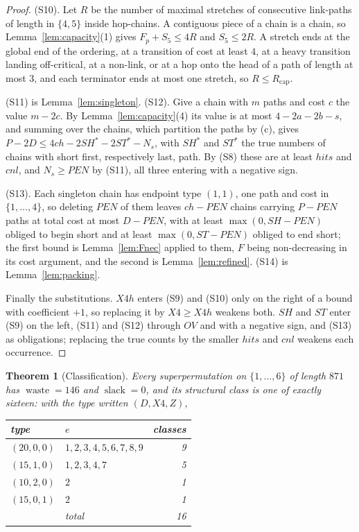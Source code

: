 \documentclass[10pt]{article}
\newtheorem{theorem}{Theorem}[section]
\theoremstyle{remark}
\theoremstyle{plain}
\newcommand{\NCh}{\mathit{ch}}
\newcommand{\slack}{\operatorname{slack}}
\newcommand{\waste}{\operatorname{waste}}
\begin{document}
\begin{proof}
(S10).  Let $R$ be the number of maximal stretches of consecutive
link-paths of length in $\{4,5\}$ inside hop-chains.  A contiguous
piece of a chain is a chain, so Lemma~\ref{lem:capacity}(1) gives
$F_p+S_5\le 4R$ and $S_5\le 2R$.  A stretch ends at the global end of
the ordering, at a transition of cost at least $4$, at a heavy
transition landing off-critical, at a non-link, or at a hop onto the
head of a path of length at most $3$, and each terminator ends at most
one stretch, so $R\le R_{\mathrm{cap}}$.

(S11) is Lemma~\ref{lem:singleton}.  (S12).  Give a chain with $m$
paths and cost $c$ the value $m-2c$.  By Lemma~\ref{lem:capacity}(4)
its value is at most $4-2a-2b-s$, and summing over the chains, which
partition the paths by (c), gives
$P-2D\le 4\NCh-2\mathit{SH}^*-2\mathit{ST}^*-N_s$, with
$\mathit{SH}^*$ and $\mathit{ST}^*$ the true numbers of chains with
short first, respectively last, path.  By (S8) these are at least
$\mathit{hits}$ and $\mathit{cnl}$, and $N_s\ge\mathit{PEN}$ by
(S11), all three entering with a negative sign.

(S13).  Each singleton chain has endpoint type $(1,1)$, one path and
cost in $\{1,\dots,4\}$, so deleting $\mathit{PEN}$ of them leaves
$\NCh-\mathit{PEN}$ chains carrying $P-\mathit{PEN}$ paths at total
cost at most $D-\mathit{PEN}$, with at least
$\max(0,\mathit{SH}-\mathit{PEN})$ obliged to begin short and at least
$\max(0,\mathit{ST}-\mathit{PEN})$ obliged to end short; the first
bound is Lemma~\ref{lem:Fnec} applied to them, $F$ being non-decreasing
in its cost argument, and the second is Lemma~\ref{lem:refined}.
(S14) is Lemma~\ref{lem:packing}.

Finally the substitutions.  $X4h$ enters (S9) and (S10) only on the
right of a bound with coefficient $+1$, so replacing it by $X4\ge X4h$
weakens both.  $\mathit{SH}$ and $\mathit{ST}$ enter (S9) on the left,
(S11) and (S12) through $\mathit{OV}$ and with a negative sign, and
(S13) as obligations; replacing the true counts by the smaller
$\mathit{hits}$ and $\mathit{cnl}$ weakens each occurrence.
\end{proof}

\begin{theorem}[Classification]\label{thm:classes}
Every superpermutation on $\{1,\dots,6\}$ of length $871$ has
$\waste=146$ and $\slack=0$, and its structural class is one of exactly
sixteen: with the type written $(D,X4,Z)$,
\begin{center}
\begin{tabular}{@{}llr@{}}
\toprule
type & $e$ & classes\\
\midrule
$(20,0,0)$ & $1,2,3,4,5,6,7,8,9$ & 9\\
$(15,1,0)$ & $1,2,3,4,7$ & 5\\
$(10,2,0)$ & $2$ & 1\\
$(15,0,1)$ & $2$ & 1\\
\midrule
& total & 16\\
\bottomrule
\end{tabular}
\end{center}
\end{theorem}
\end{document}
